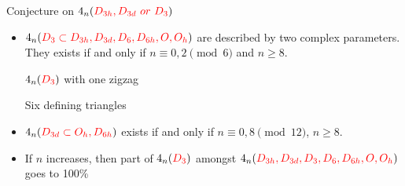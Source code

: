 \documentclass[%
pdf,
colorBG,
slideColor,
]{prosper}
\begin{document}
\begin{slide}{Conjecture on $4_n(\textcolor{red}{D_{3h},D_{3d}\,\,or\,\, D_3})$}
\vspace{-3mm}
\begin{itemize}
\item $4_n(\textcolor{red}{D_3 \subset  D_{3h}, D_{3d}, D_6, D_{6h}, O, O_h})$ are described by two complex parameters. They exists if and only if $n\equiv 0,2\pmod 6$ and $n\geq 8$.
\begin{center}
\begin{minipage}{50mm}
\centering
{}\par
$4_n(\textcolor{red}{D_3})$ with one zigzag
\end{minipage}
\begin{minipage}{50mm}
\centering
{}\par
Six defining triangles
\end{minipage}

\end{center}


\item $4_n(\textcolor{red}{D_{3d} \subset O_h, D_{6h}})$ exists if and only if $n\equiv 0,8\pmod {12}$, $n\geq 8$.

\item If $n$ increases, then part of $4_n(\textcolor{red}{D_3})$ amongst $4_n(\textcolor{red}{D_{3h},D_{3d}, D_3, D_6, D_{6h}, O, O_{h}})$ goes to 100\%
\end{itemize}

\end{slide}
\end{document}
